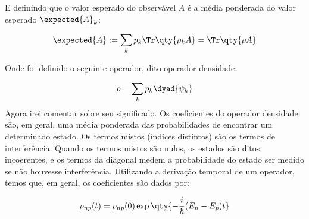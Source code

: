 \documentclass{article}
\begin{document}
	E definindo que o valor esperado do observável $A$ é a média ponderada do valor esperado $\expected{A}_k$:
	
	$$\expected{A}:=\sum_k p_k \Tr \qty{\rho_k A} = \Tr \qty{\rho A}$$
	
	Onde foi definido o seguinte operador, dito operador densidade:
	
	$$\rho=\sum_k p_k\dyad{\psi_k}$$
	\newpage
	Agora irei comentar sobre seu significado. Os coeficientes do operador densidade são, em geral, uma média ponderada das probabilidades de encontrar um determinado estado. Os termos mistos (índices distintos) são os termos de interferência. Quando os termos mistos são nulos, os estados são ditos incoerentes, e os termos da diagonal medem a probabilidade do estado ser medido se não houvesse interferência. Utilizando a derivação temporal de um operador, temos que, em geral, os coeficientes são dados por:
	
	$$\rho_{np}(t)=\rho_{np}(0)\exp \qty{- \frac{i}{\hbar}(E_n-E_p)t}$$
	
\end{document}
